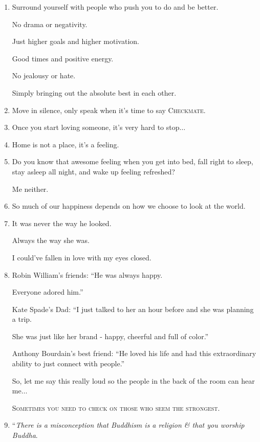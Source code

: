 \documentclass{article}
\numberwithin{equation}{section}
\begin{document}
\begin{enumerate}
    The deer isn't crossing the road.
    
    The road is crossing the forest.
    \item Surround yourself with people who push you to do and be better.
    
    No drama or negativity.
    
    Just higher goals and higher motivation.
    
    Good times and positive energy.
    
    No jealousy or hate.
    
    Simply bringing out the absolute best in each other.
    \item Move in silence, only speak when it's time to say \textsc{Checkmate}.
    \item Once you start loving someone, it's very hard to stop$\ldots$
    \item Home is not a place, it's a feeling.
    \item Do you know that awesome feeling when you get into bed, fall right to sleep, stay asleep all night, and wake up feeling refreshed?
    
    Me neither.
    \item So much of our happiness depends on how we choose to look at the world.
    \item It was never the way he looked.
    
    Always the way she was.
    
    I could've fallen in love with my eyes closed.
    \item Robin William's friends: ``He was always happy.
    
    Everyone adored him.''
    
    Kate Spade's Dad: ``I just talked to her an hour before and she was planning a trip.
    
    She was just like her brand - happy, cheerful and full of color.''
    
    Anthony Bourdain's best friend: ``He loved his life and had this extraordinary ability to just connect with people.''
    
    So, let me say this really loud so the people in the back of the room can hear me$\ldots$
    
    \textsc{Sometimes you need to check on those who seem the strongest}.
    \item ``\textit{There is a misconception that Buddhism is a religion \& that you worship Buddha}.
    

\end{enumerate}
\end{document}
